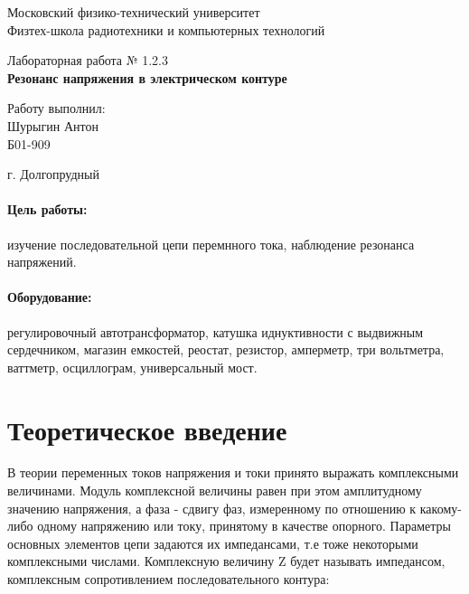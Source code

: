 \documentclass[a4paper, 14pt]{extarticle}%
\date{}
\begin{document}
\begin{titlepage}
	\begin{center}
		\large 	Московский физико-технический университет \\
		Физтех-школа радиотехники и компьютерных технологий\\
		\vspace{0.2cm}
		
		\vspace{4.5cm}
		Лабораторная работа № 1.2.3 \\ \vspace{0.2cm}
		\LARGE \textbf{Резонанс напряжения в электрическом контуре}
	\end{center}
	\vspace{2.3cm} \large
	
	\begin{center}
		Работу выполнил: \\
		Шурыгин Антон \\
		Б01-909

	\end{center}
	
	\begin{center} \vspace{60mm}
		г. Долгопрудный \\
	\end{center}
\end{titlepage}



\paragraph*{Цель работы:} изучение последовательной цепи перемнного тока, наблюдение резонанса напряжений.
\paragraph*{Оборудование:} регулировочный автотрансформатор, катушка иднуктивности с выдвижным сердечником, магазин емкостей, реостат, резистор, амперметр, три вольтметра, ваттметр, осциллограм, универсальный мост.



\section{Теоретическое введение}

В теории переменных токов напряжения и токи принято выражать комплексными величинами. Модуль комплексной величины равен при этом амплитудному значению напряжения, а фаза - сдвигу фаз, измеренному по отношению к какому-либо одному напряжению или току, принятому в качестве опорного. Параметры основных элементов цепи задаются их импедансами, т.е тоже некоторыми комплексными числами.
\newline
Комплексную величину Z будет называть импедансом, комплексным сопротивлением последовательного контура:
\end{document}
